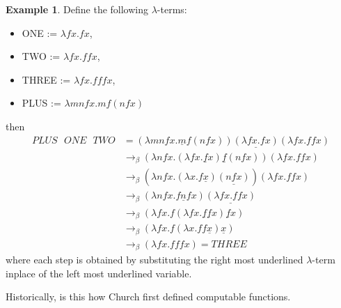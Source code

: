 \documentclass[12pt]{article}
\theoremstyle{plane}
\theoremstyle{definition}
\newtheorem{example}{Example}
\begin{document}
	\begin{example}
		\label{plusonetwo}
		Define the following $\lambda$-terms:
		\begin{itemize}
			\item ONE := $\lambda f x . fx$,
			\item TWO := $\lambda f x . ffx$,
			\item THREE := $\lambda fx. fffx$,
			\item PLUS := $\lambda mnfx. mf(nfx)$
		\end{itemize}
		then
		\begin{align*}
			PLUS\text{ }ONE\text{ }TWO &= (\lambda mnfx. \underline{m}f(nfx))\underline{(\lambda f x . fx)}(\lambda f x . ffx)\\
			&\to_\beta (\lambda nfx. (\lambda f x . \underline{f}x)\underline{f}(nfx))(\lambda f x . ffx)\\
			&\to_\beta (\lambda nfx. (\lambda x . f\underline{x})\underline{(nfx)})(\lambda f x . ffx)\\
			&\to_\beta (\lambda nfx. f\underline{n}fx)\underline{(\lambda f x . ffx)}\\
			&\to_\beta (\lambda fx. f(\lambda f x . \underline{f}\underline{f}x)\underline{f}x)\\
			&\to_\beta (\lambda fx. f(\lambda  x . ff\underline{x})\underline{x})\\
			&\to_\beta (\lambda fx. fffx) = THREE
		\end{align*}
		where each step is obtained by substituting the right most underlined $\lambda$-term inplace of the left most underlined variable.
	\end{example}
	Historically, is this how Church first defined computable functions.
	
\end{document}
